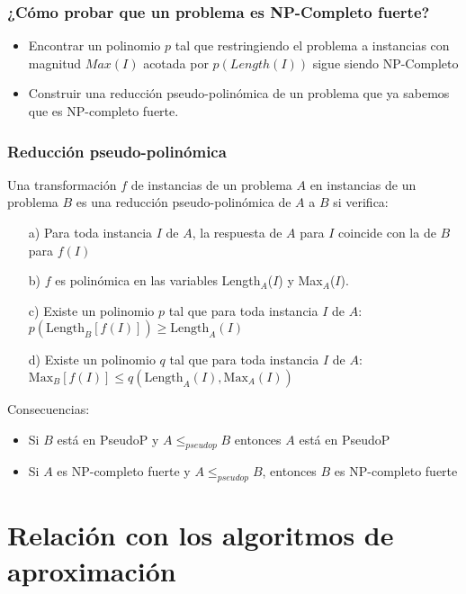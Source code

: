 \documentclass{beamer}
\begin{document}
\begin{frame}
	\frametitle{¿Cómo probar que un problema es NP-Completo fuerte?}
	\begin{itemize}
		\item Encontrar un polinomio $p$ tal que restringiendo el problema a instancias con magnitud $Max(I)$ acotada por $p(Length(I))$ sigue siendo NP-Completo
		\item Construir una reducción pseudo-polinómica de un problema que ya sabemos que es NP-completo fuerte.
	\end{itemize}
\end{frame}

\begin{frame}
	\frametitle{Reducción pseudo-polinómica}
	 Una transformación $f$ de instancias de un problema $A$ en instancias de un problema $B$ es una \alert{reducción pseudo-polinómica} de $A$ a $B$ si verifica:
	 \begin{itemize}
	 	\item[a)] Para toda instancia $I$ de $A$, la respuesta de $A$ para $I$ coincide con la de $B$ para $f(I)$
	 	\item[b)] $f$ es polinómica en las variables Length$_A$($I$) y Max$_A$($I$).
	 	\item[c)] Existe un polinomio $p$ tal que para toda instancia $I$ de $A$: $p(\text{Length}_B[f(I)])\geq\text{Length}_A(I)$
	 	\item[d)] Existe un polinomio $q$ tal que para toda instancia $I$ de $A$:
	 	$\text{Max}_B[f(I)]\leq q(\text{Length}_A(I), \text{Max}_A(I))$
	 \end{itemize}
     Consecuencias:
     \begin{itemize}
     	\item Si $B$ está en PseudoP  y $A\leq_{pseudop}B$ entonces $A$ está en PseudoP
     	\item Si $A$ es NP-completo fuerte y $A\leq_{pseudop}B$, entonces $B$ es NP-completo fuerte
     \end{itemize}
 
\end{frame}

\section{Relación con los algoritmos de aproximación}
\end{document}
